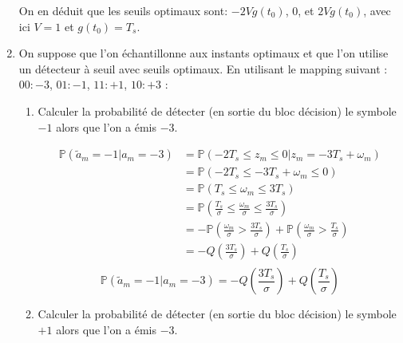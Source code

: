 \documentclass[frenchb]{article}
\begin{document}
\begin{enumerate}
        On en déduit que les seuils optimaux sont: $-2 V g(t_0)$, $0$, et $2 V g(t_0)$, avec ici $V = 1$ et $g(t_0) = T_s$. 
        
        \item On suppose que l'on échantillonne aux instants optimaux et que l'on utilise un détecteur à seuil avec seuils optimaux. En utilisant le mapping suivant : $00: -3$,  $01: -1$, $11: +1$,  $10: +3$ :
                \begin{enumerate}
                    \item Calculer la probabilité de détecter (en sortie du bloc décision) le symbole $-1$ alors que l'on a émis $-3$.
                    
                    \begin{equation*}
                    \begin{split}                    
                    \mathbb{P}\left(\tilde{a}_m = -1 |a_m = -3\right) & = \mathbb{P}\left(-2 T_s \leq z_m \leq 0 | z_m = -3 T_s + \omega_m\right)\\
                    & = \mathbb{P}\left(-2 T_s \leq -3 T_s + \omega_m \leq 0\right) \\
                    & = \mathbb{P}\left(T_s \leq \omega_m \leq 3 T_s\right) \\
                    & = \mathbb{P}\left(\frac{T_s}{\sigma} \leq \frac{\omega_m}{\sigma} \leq \frac{3 T_s}{\sigma}\right) \\
                    & = - \mathbb{P}\left(\frac{\omega_m}{\sigma} > \frac{3 T_s}{\sigma} \right) + \mathbb{P}\left(\frac{\omega_m}{\sigma} > \frac{T_s}{\sigma} \right)\\
                    & = - Q\left(\frac{3 T_s}{\sigma} \right) + Q\left(\frac{T_s}{\sigma} \right)\\
                    \end{split}
                    \end{equation*}
                    $$\boxed{\mathbb{P}\left(\tilde{a}_m = -1 |a_m = -3\right) = - Q\left(\frac{3 T_s}{\sigma} \right) + Q\left(\frac{T_s}{\sigma} \right)}$$
                    \item Calculer la probabilité de détecter (en sortie du bloc décision) le symbole $+1$ alors que l'on a émis $-3$.
                    

\end{enumerate}
\end{enumerate}
\end{document}
